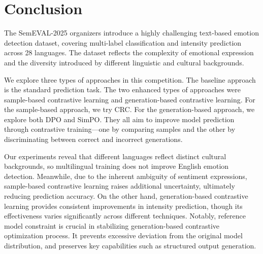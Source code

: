 \documentclass[11pt]{article}
\begin{document}
\section{Conclusion}


The SemEVAL-2025 organizers introduce a highly challenging text-based emotion detection dataset, covering multi-label classification and intensity prediction across 28 languages. The dataset reflects the complexity of emotional expression and the diversity introduced by different linguistic and cultural backgrounds.


We explore three types of approaches in this competition. The baseline approach is the standard prediction task. The two enhanced types of approaches were sample-based contrastive learning and generation-based contrastive learning. For the sample-based approach, we try CRC. For the generation-based approach, we explore both DPO and SimPO. They all aim to improve model prediction through contrastive training—one by comparing samples and the other by discriminating between correct and incorrect generations.


Our experiments reveal that different languages reflect distinct cultural backgrounds, so multilingual training does not improve English emotion detection. Meanwhile, due to the inherent ambiguity of sentiment expressions, sample-based contrastive learning raises additional uncertainty, ultimately reducing prediction accuracy. On the other hand, generation-based contrastive learning provides consistent improvements in intensity prediction, though its effectiveness varies significantly across different techniques. Notably, reference model constraint is crucial in stabilizing generation-based contrastive optimization process. It prevents excessive deviation from the original model distribution, and preserves key capabilities such as structured output generation.
\end{document}

